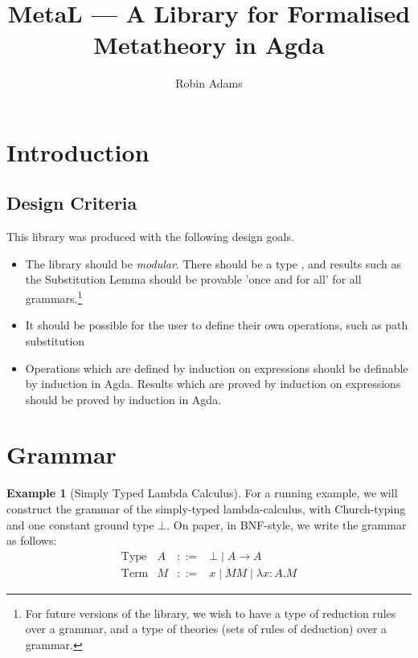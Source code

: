 \documentclass{article}
\title{MetaL --- A Library for Formalised Metatheory in Agda}
\author{Robin Adams}
\theoremstyle{definition}
\newtheorem{example}[lm]{Example}
\begin{document}
\maketitle

\section{Introduction}


\subsection{Design Criteria}

This library was produced with the following design goals.

\begin{itemize}
\item
The library should be \emph{modular}.  There should be a type , and results such as the Substitution Lemma 
should be
provable 'once and for all' for all grammars.\footnote{For future versions of the library, we wish to have a type of reduction rules over a grammar, and a type of theories (sets of rules of deduction) over a grammar.}
\item
It should be possible for the user to define their own operations, such as path substitution %
\item
Operations which are defined by induction on expressions should be definable by induction in Agda.  Results which are proved by induction on expressions should be proved by induction in Agda.
\end{itemize}

\section{Grammar}

\begin{example}[Simply Typed Lambda Calculus]
\label{ex:stlc}
For a running example, we will construct the grammar of the simply-typed lambda-calculus, with Church-typing and one constant ground type $\bot$.  On paper, in BNF-style, we write the grammar as follows:
\[ \begin{array}{lrcl}
\text{Type} & A & ::= & \bot \mid A \rightarrow A \\
\text{Term} & M & ::= & x \mid MM \mid \lambda x : A . M
\end{array} \]
\end{example}
\end{document}
